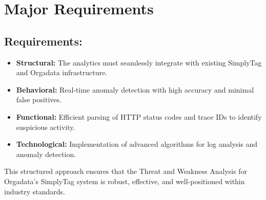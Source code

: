 %
%

\chapter{Major Requirements}

\section{Requirements:}

\begin{itemize}
	\item \textbf{Structural:} The analytics must seamlessly integrate with existing SimplyTag and Orgadata infrastructure.
	\item \textbf{Behavioral:} Real-time anomaly detection with high accuracy and minimal false positives.
	\item \textbf{Functional:} Efficient parsing of HTTP status codes and trace IDs to identify suspicious activity.
	\item \textbf{Technological:} Implementation of advanced algorithms for log analysis and anomaly detection.
\end{itemize}
  
This structured approach ensures that the Threat and Weakness Analysis for Orgadata’s SimplyTag system is robust, effective, and well-positioned within industry standards.
  
   
  
   

 